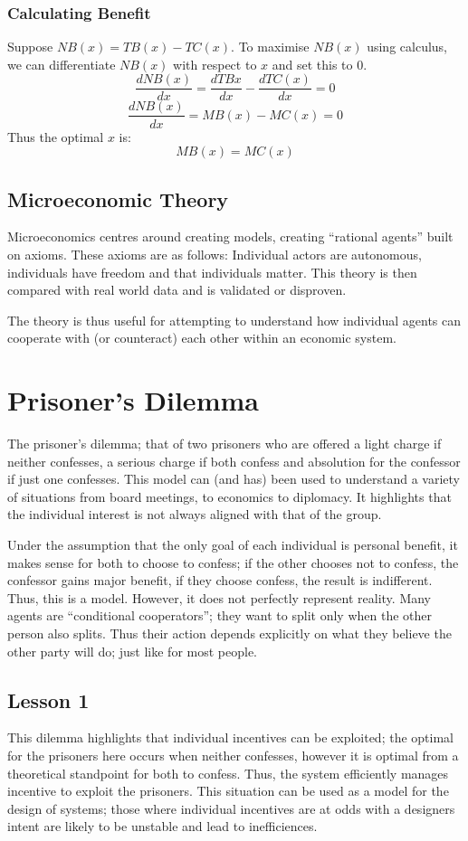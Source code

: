 \documentclass[12pt]{report}
\begin{document}
\subsection*{Calculating Benefit}
Suppose \(NB(x) = TB(x) - TC(x)\). To maximise \(NB(x)\) using calculus, we can differentiate \(NB(x)\) with respect
to \(x\) and set this to \(0\).
\[\frac{dNB(x)}{dx} = \frac{dTB{x}}{dx} - \frac{dTC(x)}{dx} = 0\]
\[\frac{dNB(x)}{dx} = MB(x) - MC(x) = 0\]
Thus the optimal \(x\) is:
\[MB(x) = MC(x)\]


\section*{Microeconomic Theory}
Microeconomics centres around creating models, creating ``rational agents'' built on axioms.
These axioms are as follows: Individual actors are autonomous, individuals have freedom and that individuals matter.
This theory is then compared with real world data and is validated or disproven.
\par
The theory is thus useful for attempting to understand how individual agents can cooperate
with (or counteract) each other within an economic system.

\chapter*{Prisoner's Dilemma}
The prisoner's dilemma; that of two prisoners who are offered a light charge if neither confesses,
a serious charge if both confess and absolution for the confessor if just one confesses.
This model can (and has) been used to understand a variety of situations from board meetings, 
to economics to diplomacy. It highlights that the individual interest is not always aligned with that of the group.
\par
Under the assumption that the only goal of each individual is personal benefit, it makes sense for both to
choose to confess; if the other chooses not to confess, the confessor gains major benefit, if they choose confess,
 the result is indifferent. Thus, this is a model. However, it does not perfectly represent reality. Many agents are
 ``conditional cooperators''; they want to split only when the other person also splits. Thus their action depends
 explicitly on what they believe the other party will do; just like for most people.
\par
\section*{Lesson 1}
This dilemma highlights that individual incentives can be exploited; the optimal for the prisoners here occurs when neither confesses,
however it is optimal from a theoretical standpoint for both to confess. Thus, the system efficiently manages
incentive to exploit the prisoners. This situation can be used as a model for the design of systems; those where
individual incentives are at odds with a designers intent are likely to be unstable and lead to inefficiences.
\end{document}
